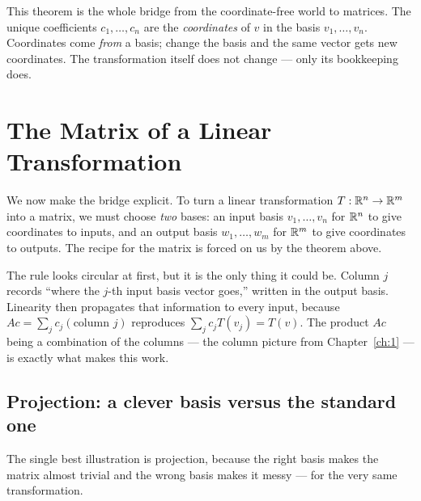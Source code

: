 This theorem is the whole bridge from the coordinate-free world to matrices. The unique coefficients $c_1,\dots,c_n$ are the \emph{coordinates} of $v$ in the basis $v_1,\dots,v_n$. Coordinates come \emph{from} a basis; change the basis and the same vector gets new coordinates. The transformation itself does not change --- only its bookkeeping does.

\section{The Matrix of a Linear Transformation}

We now make the bridge explicit. To turn a linear transformation $T:\mathbb{R}^n\to\mathbb{R}^m$ into a matrix, we must choose \emph{two} bases: an input basis $v_1,\dots,v_n$ for $\mathbb{R}^n$ to give coordinates to inputs, and an output basis $w_1,\dots,w_m$ for $\mathbb{R}^m$ to give coordinates to outputs. The recipe for the matrix is forced on us by the theorem above.


The rule looks circular at first, but it is the only thing it could be. Column $j$ records ``where the $j$-th input basis vector goes,'' written in the output basis. Linearity then propagates that information to every input, because $A c = \sum_j c_j(\text{column }j)$ reproduces $\sum_j c_j T(v_j) = T(v)$. The product $Ac$ being a combination of the columns --- the column picture from Chapter~\ref{ch:1} --- is exactly what makes this work.

\subsection{Projection: a clever basis versus the standard one}

The single best illustration is projection, because the right basis makes the matrix almost trivial and the wrong basis makes it messy --- for the very same transformation.

